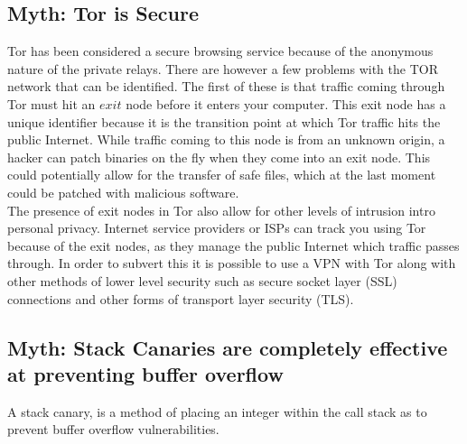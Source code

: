 \documentclass{article}
\newcommand\tab[1][1cm]{\hspace*{#1}}
\begin{document}
\subsection{Myth: Tor is Secure}
\tab Tor has been considered a secure browsing service because of the anonymous nature of the private relays. There are however a few problems with the TOR network that can be identified. The first of these is that traffic coming through Tor must hit an $exit$ node before it enters your computer. This exit node has a unique identifier because it is the transition point at which Tor traffic hits the public Internet. While traffic coming to this node is from an unknown origin, a hacker can patch binaries on the fly when they come into an exit node. This could potentially allow for the transfer of safe files, which at the last moment could be patched with malicious software. 
\\
\tab The presence of exit nodes in Tor also allow for other levels of intrusion intro personal privacy. Internet service providers or ISPs can track you using Tor because of the exit nodes, as they manage the public Internet which traffic passes through. In order to subvert this it is possible to use a VPN with Tor along with other methods of lower level security such as secure socket layer (SSL) connections and other forms of transport layer security (TLS).

\subsection{Myth: Stack Canaries are completely effective at preventing buffer overflow}
\tab A stack canary, is a method of placing an integer within the call stack as to prevent buffer overflow vulnerabilities. 
\\
\end{document}
